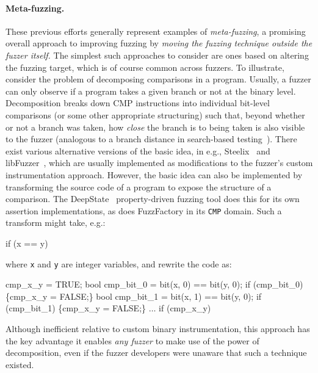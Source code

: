 \paragraph{Meta-fuzzing.}
These previous efforts generally represent examples of 
\emph{meta-fuzzing}, a promising overall approach to improving fuzzing by 
\emph{moving the fuzzing technique outside the fuzzer itself.}  The simplest 
such approaches to consider are ones based on altering the fuzzing target, 
which is of course common across fuzzers. To illustrate, consider
the problem of decomposing comparisons in a program.  Usually, a fuzzer can only observe if a 
program takes a given branch or not at the binary level.  Decomposition breaks 
down CMP instructions into individual bit-level comparisons (or some other 
appropriate structuring) such that, beyond whether or not a branch was taken,
how \emph{close} the branch is to being taken is also visible to the fuzzer  (analogous to a branch 
distance in search-based testing~\cite{mcminn2004search}).  There exist various alternative versions of 
the basic idea, in e.g., Steelix~\cite{Steelix} and
libFuzzer~\cite{libFuzzer}, which are usually implemented 
as modifications to the fuzzer's custom instrumentation approach.  However, the basic 
idea can also be implemented by transforming the source code of a program to 
expose the structure of a comparison.  The DeepState~\cite{DeepState} property-driven fuzzing 
tool does this for its own assertion implementations, as does FuzzFactory in 
its \texttt{CMP} domain.  Such a transform might take, e.g.:

\begin{code}

if (x == y)
\end{code}

\noindent where {\tt x} and {\tt y} are integer variables, and rewrite the code 
as:

\begin{code}
cmp\_x\_y = TRUE;
bool cmp\_bit\_0 = bit(x, 0) == bit(y, 0);
if (cmp\_bit\_0) \{cmp\_x\_y = FALSE;\}
bool cmp\_bit\_1 = bit(x, 1) == bit(y, 0);
if (cmp\_bit\_1) \{cmp\_x\_y = FALSE;\}
$\ldots$
if (cmp\_x\_y)
\end{code}

\noindent Although inefficient relative to custom binary instrumentation, this
approach has the key advantage it enables \emph{any fuzzer} to make use of the power of 
decomposition, even if the fuzzer developers were unaware that such a technique 
existed. 

